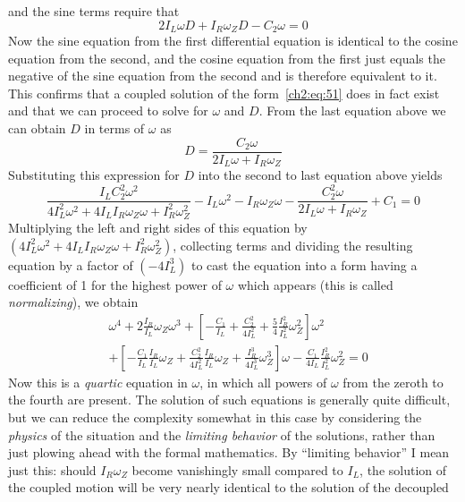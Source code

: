 and the sine terms require that
\begin{equation*}
2I_L\omega D + I_R\omega_Z D - C_2\omega = 0
\end{equation*}
Now the sine equation from the first differential equation is identical to the
cosine equation from the second, and the cosine equation from the first just
equals the negative of the sine equation from the second and is therefore
equivalent to it. This confirms that a coupled solution of the
form~\eqref{ch2:eq:51} does in fact exist and that we can proceed to solve for
$\omega$ and $D$.
From the last equation above we can obtain $D$ in terms of $\omega$ as
\begin{equation*}
D = \frac{C_2\omega}{2I_L\omega + I_R\omega_Z}
\end{equation*}
Substituting this expression for $D$ into the second to last equation above
yields
\begin{equation*}
\frac{I_L C_2^2\omega^2}{4I_L^2\omega^2 + 4I_L I_R\omega_Z\omega + I_R^2\omega_Z^2}
  - I_L\omega^2 - I_R\omega_Z\omega
  - \frac{C_2^2\omega}{2I_L\omega + I_R\omega_Z} + C_1 = 0
\end{equation*}
Multiplying the left and right sides of this equation by
$(4I_L^2\omega^2 + 4I_L I_R\omega_Z\omega + I_R^2\omega_Z^2)$, collecting
terms and dividing the resulting equation by a factor of $(-4I_L^3)$ to cast
the equation into a form having a coefficient of 1 for the highest power of
$\omega$ which appears (this is called \emph{normalizing}), we obtain
\begin{align*}
&\omega^4 + 2\frac{I_R}{I_L}\omega_Z\omega^3
  + \left[-\frac{C_1}{I_L} + \frac{C_2^2}{4I_L^2}
    + \frac{5}{4}\frac{I_R^2}{I_L^2}\omega_Z^2\right]\omega^2\\
&+ \left[-\frac{C_1}{I_L}\frac{I_R}{I_L}\omega_Z
    + \frac{C_2^2}{4I_L^2}\frac{I_R}{I_L}\omega_Z
    + \frac{I_R^3}{4I_L^3}\omega_Z^3\right]\omega
  - \frac{C_1}{4I_L}\frac{I_R^2}{I_L^2}\omega_Z^2 = 0
\end{align*}
Now this is a \emph{quartic} equation in $\omega$, in which all powers of
$\omega$ from the zeroth to the fourth are present. The solution of such
equations is generally quite difficult, but we can reduce the complexity
somewhat in this case by considering the \emph{physics} of the situation and
the \emph{limiting behavior} of the solutions, rather than just plowing ahead
with the formal mathematics. By ``limiting behavior'' I mean just this: should
$I_R\omega_Z$ become vanishingly small compared to $I_L$, the solution of the
coupled motion will be very nearly identical to the solution of the decoupled
